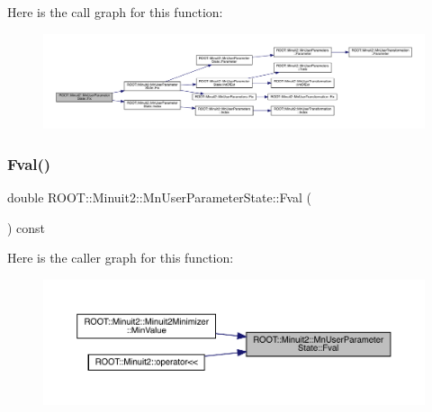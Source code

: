 Here is the call graph for this function\+:
\nopagebreak
\begin{figure}[H]
\begin{center}
\leavevmode
\includegraphics[width=350pt]{d3/de0/classROOT_1_1Minuit2_1_1MnUserParameterState_a9d24e3eed7080907f4368e87e8770dcd_cgraph}
\end{center}
\end{figure}
\mbox{\label{classROOT_1_1Minuit2_1_1MnUserParameterState_ab231f5e0a1fa3314210f7849ab382b86}} 
\subsubsection{\texorpdfstring{Fval()}{Fval()}\hspace{0.1cm}{\footnotesize\ttfamily [1/3]}}
{\footnotesize\ttfamily double R\+O\+O\+T\+::\+Minuit2\+::\+Mn\+User\+Parameter\+State\+::\+Fval (\begin{DoxyParamCaption}{ }\end{DoxyParamCaption}) const\hspace{0.3cm}{\ttfamily [inline]}}

Here is the caller graph for this function\+:
\nopagebreak
\begin{figure}[H]
\begin{center}
\leavevmode
\includegraphics[width=350pt]{d3/de0/classROOT_1_1Minuit2_1_1MnUserParameterState_ab231f5e0a1fa3314210f7849ab382b86_icgraph}
\end{center}
\end{figure}
\mbox{\label{classROOT_1_1Minuit2_1_1MnUserParameterState_ab231f5e0a1fa3314210f7849ab382b86}} 
